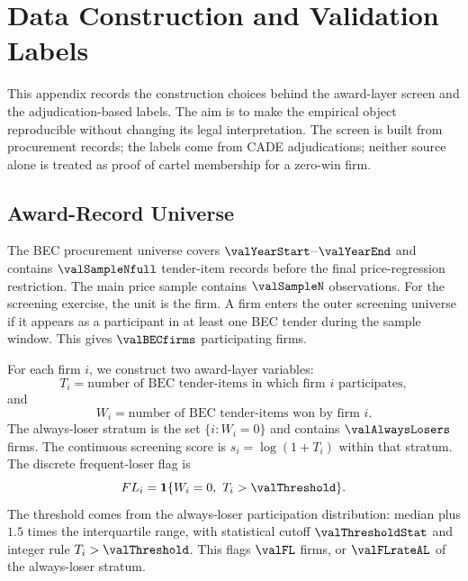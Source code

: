 \section{Data Construction and Validation Labels}
\label{app:data_labels_v18}

This appendix records the construction choices behind the
award-layer screen and the adjudication-based labels. The aim is
to make the empirical object reproducible without changing its
legal interpretation. The screen is built from procurement
records; the labels come from CADE adjudications; neither source
alone is treated as proof of cartel membership for a zero-win
firm.

\subsection{Award-Record Universe}
\label{app:award_universe_v18}

The BEC procurement universe covers $\valYearStart$--$\valYearEnd$
and contains $\valSampleNfull$ tender-item records before the
final price-regression restriction. The main price sample contains
$\valSampleN$ observations. For the screening exercise, the unit
is the firm. A firm enters the outer screening universe if it
appears as a participant in at least one BEC tender during the
sample window. This gives $\valBECfirms$ participating firms.

For each firm $i$, we construct two award-layer variables:
\[
  T_i=\text{number of BEC tender-items in which firm } i
  \text{ participates},
\]
and
\[
  W_i=\text{number of BEC tender-items won by firm } i.
\]
The always-loser stratum is the set $\{i:W_i=0\}$ and contains
$\valAlwaysLosers$ firms. The continuous screening score is
$s_i=\log(1+T_i)$ within that stratum. The discrete frequent-loser
flag is
\[
  FL_i=\mathbf{1}\{W_i=0,\ T_i>\valThreshold\}.
\]
The threshold comes from the always-loser participation
distribution: median plus $1.5$ times the interquartile range,
with statistical cutoff $\valThresholdStat$ and integer rule
$T_i>\valThreshold$. This flags $\valFL$ firms, or
$\valFLrateAL$ of the always-loser stratum.

